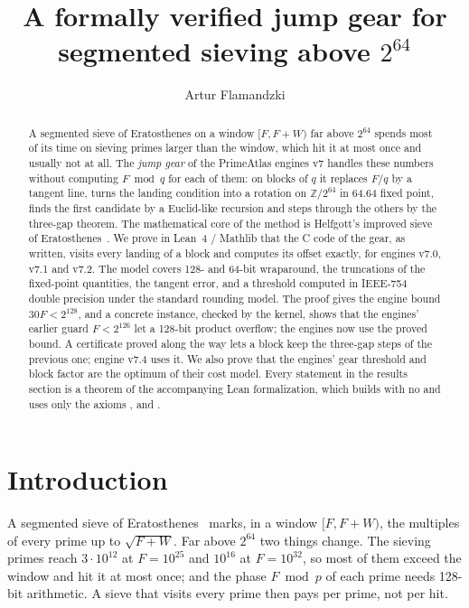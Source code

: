 \documentclass[11pt]{amsart}
\title[A verified jump gear above $2^{64}$]{A formally verified jump gear for segmented
sieving above $2^{64}$}
\author{Artur Flamandzki}
\date{}
\newcommand{\lean}[1]{\texttt{\detokenize{#1}}}
\theoremstyle{definition}
\begin{document}
\begin{abstract}
A segmented sieve of Eratosthenes on a window $[F, F+W)$ far above $2^{64}$ spends most of its
time on sieving primes larger than the window, which hit it at most once and usually not at
all. The \emph{jump gear} of the PrimeAtlas engines v7 handles these numbers without computing
$F \bmod q$ for each of them: on blocks of $q$ it replaces $F/q$ by a tangent line, turns the
landing condition into a rotation on $\mathbb{Z}/2^{64}$ in 64.64 fixed point, finds the first
candidate by a Euclid-like recursion and steps through the others by the three-gap theorem.
The mathematical core of the method is Helfgott's improved sieve of
Eratosthenes~\cite{helfgott}. We prove in Lean~4 / Mathlib that the C code of the gear, as
written, visits every landing of a block and computes its offset exactly, for engines v7.0,
v7.1 and v7.2. The model covers 128- and 64-bit wraparound, the truncations of the
fixed-point quantities, the tangent error, and a threshold computed in IEEE-754 double
precision under the standard rounding model. The proof gives the engine bound
$30F < 2^{128}$, and a concrete instance, checked by the kernel, shows that the engines'
earlier guard $F < 2^{126}$ let a 128-bit product overflow; the engines now use the proved
bound. A certificate proved along the way lets a block keep the three-gap steps of the
previous one; engine v7.4 uses it. We also prove that the engines' gear threshold and block
factor are the optimum of their cost model. Every statement in the results section is a
theorem of the accompanying Lean formalization, which builds with no \lean{sorry} and uses
only the axioms \lean{propext}, \lean{Quot.sound} and \lean{Classical.choice}.
\end{abstract}

\maketitle

\section{Introduction}

A segmented sieve of Eratosthenes~\cite{bayshudson} marks, in a window $[F, F+W)$, the
multiples of every prime up to $\sqrt{F+W}$. Far above $2^{64}$ two things change. The
sieving primes reach $3\cdot 10^{12}$ at $F = 10^{25}$ and $10^{16}$ at $F = 10^{32}$, so most
of them exceed the window and hit it at most once; and the phase $F \bmod p$ of each prime
needs 128-bit arithmetic. A sieve that visits every prime then pays per prime, not per hit.
\end{document}
